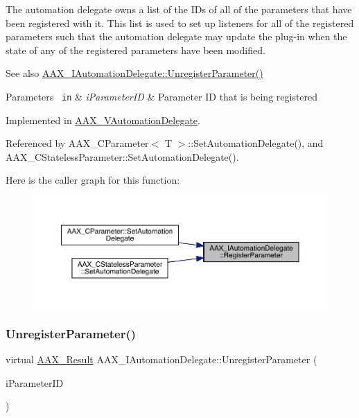 The automation delegate owns a list of the I\+Ds of all of the parameters that have been registered with it. This list is used to set up listeners for all of the registered parameters such that the automation delegate may update the plug-\/in when the state of any of the registered parameters have been modified.

\begin{DoxySeeAlso}{See also}
\mbox{\hyperlink{a01773_ab1c1d4292460119b22d68247150cc1a0}{A\+A\+X\+\_\+\+I\+Automation\+Delegate\+::\+Unregister\+Parameter()}}
\end{DoxySeeAlso}

\begin{DoxyParams}[1]{Parameters}
\mbox{\texttt{ in}}  & {\em i\+Parameter\+ID} & Parameter ID that is being registered \\
\hline
\end{DoxyParams}


Implemented in \mbox{\hyperlink{a01893_a763555a4ce0c2683769dd184fd2fa593}{A\+A\+X\+\_\+\+V\+Automation\+Delegate}}.



Referenced by A\+A\+X\+\_\+\+C\+Parameter$<$ T $>$\+::\+Set\+Automation\+Delegate(), and A\+A\+X\+\_\+\+C\+Stateless\+Parameter\+::\+Set\+Automation\+Delegate().

Here is the caller graph for this function\+:
\nopagebreak
\begin{figure}[H]
\begin{center}
\leavevmode
\includegraphics[width=350pt]{a01773_a4d91efb2d922729d02e2ea7d7a05ed10_icgraph}
\end{center}
\end{figure}
\mbox{\label{a01773_ab1c1d4292460119b22d68247150cc1a0}} 
\subsubsection{\texorpdfstring{UnregisterParameter()}{UnregisterParameter()}}
{\footnotesize\ttfamily virtual \mbox{\hyperlink{a00392_a4d8f69a697df7f70c3a8e9b8ee130d2f}{A\+A\+X\+\_\+\+Result}} A\+A\+X\+\_\+\+I\+Automation\+Delegate\+::\+Unregister\+Parameter (\begin{DoxyParamCaption}\item[{\mbox{\hyperlink{a00392_a1440c756fe5cb158b78193b2fc1780d1}{A\+A\+X\+\_\+\+C\+Param\+ID}}}]{i\+Parameter\+ID }\end{DoxyParamCaption})\hspace{0.3cm}{\ttfamily [pure virtual]}}

